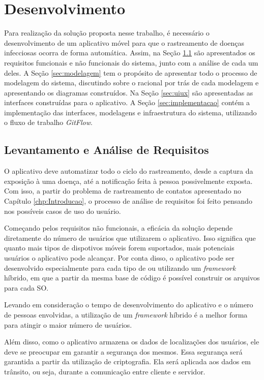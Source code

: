 \chapter{Desenvolvimento}\label{chp:desenvolvimento}

Para realização da solução proposta nesse trabalho, é necessário o desenvolvimento de um aplicativo móvel para que o rastreamento de doenças infecciosas ocorra de forma automática. Assim, na Seção \ref{sec:requisitos} são apresentados os requisitos funcionais e não funcionais do sistema, junto com a análise de cada um deles. A Seção \ref{sec:modelagem} tem o propósito de apresentar todo o processo de modelagem do sistema, discutindo sobre o racional por trás de cada modelagem e apresentando os diagramas construídos. Na Seção \ref{sec:uiux} são apresentadas as interfaces construídas para o aplicativo. A Seção \ref{sec:implementacao} contém a implementação das interfaces, modelagens e infraestrutura do sistema, utilizando o fluxo de trabalho \textit{GitFlow}.

\section{Levantamento e Análise de Requisitos}\label{sec:requisitos}
O aplicativo deve automatizar todo o ciclo do rastreamento, desde a captura da exposição à uma doença, até a notificação feita à pessoa possivelmente exposta. Com isso, a partir do problema de rastreamento de contatos apresentado no Capítulo \ref{chp:Introducao}, o processo de análise de requisitos foi feito pensando nos possíveis casos de uso do usuário.

Começando pelos requisitos não funcionais, a eficácia da solução depende diretamente do número de usuários que utilizarem o aplicativo. Isso significa que quanto mais tipos de dispotivos móveis forem suportados, mais potenciais usuários o aplicativo pode alcançar. Por conta disso, o aplicativo pode ser desenvolvido especialmente para cada tipo de  ou utilizando um \textit{framework} híbrido, em que a partir da mesma base de código é possível construir os arquivos para cada SO.

Levando em consideração o tempo de desenvolvimento do aplicativo e o número de pessoas envolvidas, a utilização de um \textit{framework} híbrido é a melhor forma para atingir o maior número de usuários.

Além disso, como o aplicativo armazena os dados de localizações dos usuários, ele deve se preocupar em garantir a segurança dos mesmos. Essa segurança será garantida a partir da utilização de criptografia. Ela será aplicada aos dados em trânsito, ou seja, durante a comunicação entre cliente e servidor.

